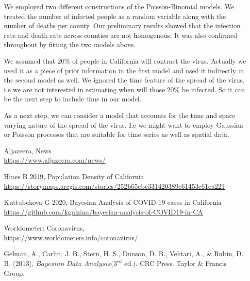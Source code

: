 \documentclass[11pt,twocolumn]{asaproc}
\begin{document}
We employed two different constructions of the Poisson-Binomial models. We treated the number of infected people as a random variable along with the number of deaths per county. Our preliminary results showed that the infection rate and death rate across counties are not homogenous. It was also confirmed throughout by fitting the two models above. 

We assumed that $20\%$ of people in California will contract the virus. Actually we used it as a piece of prior information in the first model and used it indirectly in the second model as well. We ignored the time feature of the spread of the virus, i.e we are not interested in estimating when will those $20\%$ be infected. So it can be the next step to include time in our model. 

As a next step, we can consider a model that accounts for the time and space varying nature of the spread of the virus. I.e we might want to employ Gaussian or Poisson processes that are suitable for time series as well as spatial data. 





\begin{references}
\itemsep=0pt
{\footnotesize

\item
Aljazeera, News
\\\url{https://www.aljazeera.com/news/}

\item
Hines B 2019, Population Density of California
\\\url{https://storymaps.arcgis.com/stories/252b65cbe331420389c61453c61ea221}

\item
Kuttubekova G 2020, Bayesian Analysis of COVID-19 cases in California
\\\url{https://github.com/kgulzina/bayesian-analysis-of-COVID19-in-CA}

\item 
Worldometer: Coronavirus,
\\\url{https://www.worldometers.info/coronavirus/}


\item 
Gelman, A., Carlin, J. B., Stern, H. S., Dunson, D. B., Vehtari, A., \& Rubin, D. B. (2013), $\textit{Bayesian Data Analysis} (3^{rd}$ ed.). CRC Press. Taylor \& Francis Group.



}
\end{references}
\end{document}
